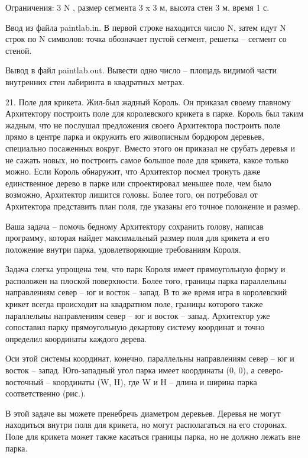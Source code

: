 \documentclass[]{article}
\begin{document}
\begin{enumerate}
Ограничения: 3 \leq N , размер сегмента 3 x 3 м, высота стен 3 м, время 1 с.

Ввод из файла paintlab.in. В первой строке находится число N, затем идут N строк по N символов: точка обозначает пустой сегмент, решетка – сегмент со стеной.

Вывод в файл paintlab.out. Вывести одно число – площадь видимой части внутренних стен лабиринта в квадратных метрах.



21. Поле для крикета. Жил-был жадный Король. Он приказал своему главному Архитектору построить поле для королевского крикета в парке. Король был таким жадным, что не послушал предложения своего Архитектора построить поле прямо в центре парка и окружить его живописным бордюром деревьев, специально посаженных вокруг. Вместо этого он приказал не срубать деревья и не сажать новых, но построить самое большое поле для крикета, какое только можно. Если Король обнаружит, что Архитектор посмел тронуть даже единственное дерево в парке или спроектировал меньшее поле, чем было возможно, Архитектор лишится головы. Более того, он потребовал от Архитектора представить план поля, где указаны его точное положение и размер.

Ваша задача – помочь бедному Архитектору сохранить голову, написав программу, которая найдет максимальный размер поля для крикета и его положение внутри парка, удовлетворяющие требованиям Короля.



Задача слегка упрощена тем, что парк Короля имеет прямоугольную форму и расположен на плоской поверхности. Более того, границы парка параллельны направлениям север – юг и восток – запад. В то же время игра в королевский крикет всегда происходит на квадратном поле, границы которого также параллельны направлениям север – юг и восток – запад. Архитектор уже сопоставил парку прямоугольную декартову систему координат и точно определил координаты каждого дерева.

Оси этой системы координат, конечно, параллельны направлениям север – юг и восток – запад. Юго-западный угол парка имеет координаты (0, 0), а северо-восточный – координаты (W, H), где W и Н – длина и ширина парка соответственно (рис.).

В этой задаче вы можете пренебречь диаметром деревьев. Деревья не могут находиться внутри поля для крикета, но могут располагаться на его сторонах. Поле для крикета может также касаться границы парка, но не должно лежать вне парка.


\end{enumerate}
\end{document}
